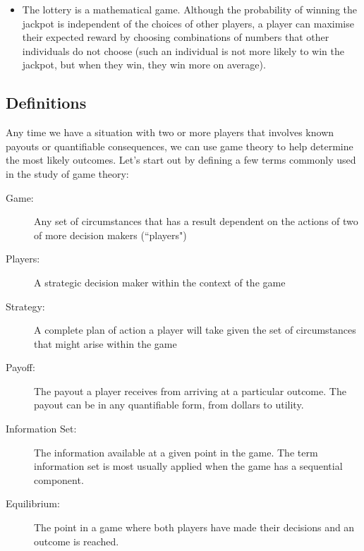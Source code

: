 \documentclass[]{report}
\begin{document}
\begin{itemize}
	\item The lottery is a mathematical game. Although the probability of
	winning the jackpot is independent of the choices of other players,
	a player can maximise their expected reward by choosing
	combinations of numbers that other individuals do not choose
	(such an individual is not more likely to win the jackpot, but when
	they win, they win more on average).
\end{itemize}




\subsection{Definitions} 
Any time we have a situation with two or more players that involves known payouts or quantifiable consequences, we can use game theory to help determine the most likely outcomes. 
Let's start out by defining a few terms commonly used in the study of game theory:

\begin{description}
	\item[Game:] Any set of circumstances that has a result dependent on the actions of two of more decision makers (``players")
	\item[Players:] A strategic decision maker within the context of the game
	\item[Strategy:] A complete plan of action a player will take given the set of circumstances that might arise within the game
	\item[Payoff:] The payout a player receives from arriving at a particular outcome. The payout can be in any quantifiable form, from dollars to utility.
	\item[Information Set:] The information available at a given point in the game. The term information set is most usually applied when the game has a sequential component.
	\item[Equilibrium:] The point in a game where both players have made their decisions and an outcome is reached.
\end{description}
\end{document}
